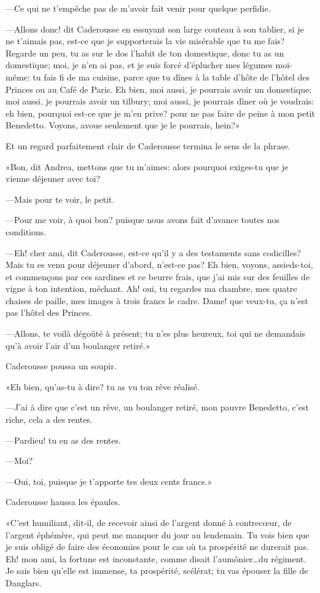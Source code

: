 —Ce qui ne t'empêche pas de m'avoir fait venir pour quelque perfidie. 

—Allons donc! dit Caderousse en essuyant son large couteau à son tablier, si je ne t'aimais pas, est-ce que je supporterais la vie misérable que tu me fais? Regarde un peu, tu as sur le dos l'habit de ton domestique, donc tu as un domestique; moi, je n'en ai pas, et je suis forcé d'éplucher mes légumes moi-même: tu fais fi de ma cuisine, parce que tu dînes à la table d'hôte de l'hôtel des Princes ou au Café de Paris. Eh bien, moi aussi, je pourrais avoir un domestique; moi aussi, je pourrais avoir un tilbury; moi aussi, je pourrais dîner où je voudrais: eh bien, pourquoi est-ce que je m'en prive? pour ne pas faire de peine à mon petit Benedetto. Voyons, avoue seulement que je le pourrais, hein?» 

Et un regard parfaitement clair de Caderousse termina le sens de la phrase. 

«Bon, dit Andrea, mettons que tu m'aimes: alors pourquoi exiges-tu que je vienne déjeuner avec toi? 

—Mais pour te voir, le petit. 

—Pour me voir, à quoi bon? puisque nous avons fait d'avance toutes nos conditions. 

—Eh! cher ami, dit Caderousse, est-ce qu'il y a des testaments sans codicilles? Mais tu es venu pour déjeuner d'abord, n'est-ce pas? Eh bien, voyons, assieds-toi, et commençons par ces sardines et ce beurre frais, que j'ai mis sur des feuilles de vigne à ton intention, méchant. Ah! oui, tu regardes ma chambre, mes quatre chaises de paille, mes images à trois francs le cadre. Dame! que veux-tu, ça n'est pas l'hôtel des Princes. 

—Allons, te voilà dégoûté à présent; tu n'es plus heureux, toi qui ne demandais qu'à avoir l'air d'un boulanger retiré.» 

Caderousse poussa un soupir. 

«Eh bien, qu'as-tu à dire? tu as vu ton rêve réalisé. 

—J'ai à dire que c'est un rêve, un boulanger retiré, mon pauvre Benedetto, c'est riche, cela a des rentes. 

—Pardieu! tu en as des rentes. 

—Moi? 

—Oui, toi, puisque je t'apporte tes deux cents francs.» 

Caderousse haussa les épaules. 

«C'est humiliant, dit-il, de recevoir ainsi de l'argent donné à contrecœur, de l'argent éphémère, qui peut me manquer du jour au lendemain. Tu vois bien que je suis obligé de faire des économies pour le cas où ta prospérité ne durerait pas. Eh! mon ami, la fortune est inconstante, comme disait l'aumônier\dots du régiment. Je sais bien qu'elle est immense, ta prospérité, scélérat; tu vas épouser la fille de Danglars. 

